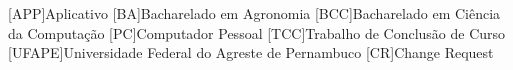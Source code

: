 \begin{acronym}[ACRONYM] 
[APP]{Aplicativo}
[BA]{Bacharelado em Agronomia}
[BCC]{Bacharelado em Ciência da Computação}
[PC]{Computador Pessoal}
[TCC]{Trabalho de Conclusão de Curso}
[UFAPE]{Universidade Federal do Agreste de Pernambuco}
[CR]{Change Request}
\end{acronym}